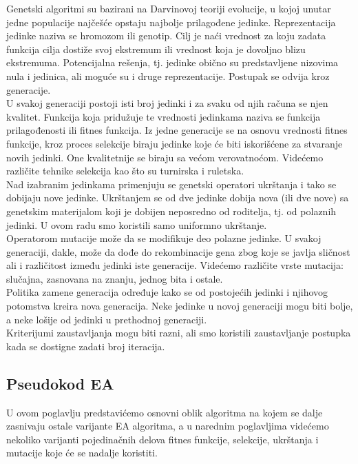 \documentclass{article}
\begin{document}
Genetski algoritmi \cite{vi_Janicic} su bazirani na Darvinovoj teoriji evolucije, u kojoj unutar jedne populacije najčešće opstaju najbolje prilagođene jedinke. Reprezentacija jedinke naziva se hromozom ili genotip. Cilj je naći vrednost za koju zadata funkcija cilja dostiže svoj ekstremum ili vrednost koja je dovoljno blizu ekstremuma. Potencijalna rešenja, tj. jedinke obično su predstavljene nizovima nula i jedinica, ali moguće su i druge reprezentacije. Postupak se odvija kroz generacije.\\

U svakoj generaciji postoji isti broj jedinki i za svaku od njih računa se njen kvalitet. Funkcija koja pridužuje te vrednosti jedinkama naziva se funkcija prilagođenosti ili fitnes funkcija. Iz jedne generacije se na osnovu vrednosti fitnes funkcije, kroz proces selekcije biraju jedinke koje će biti iskorišćene za stvaranje novih jedinki. One kvalitetnije se biraju sa većom verovatnoćom. Videćemo različite tehnike selekcija kao što su turnirska i ruletska. \\

Nad izabranim jedinkama primenjuju se genetski operatori ukrštanja i tako se dobijaju nove jedinke. Ukrštanjem se od dve jedinke dobija nova (ili dve nove) sa genetskim materijalom koji je dobijen neposredno od roditelja, tj. od polaznih jedinki. U ovom radu smo koristili samo uniformno ukrštanje. \\

Operatorom mutacije može da se modifikuje deo polazne jedinke. U svakoj generaciji, dakle, može da dođe do rekombinacije gena zbog koje se javlja sličnost ali i različitost između jedinki iste generacije. Videćemo različite vrste mutacija: slučajna, zasnovana na znanju, jednog bita i ostale. \\

Politika zamene generacija određuje kako se od postojećih jedinki i njihovog potomstva kreira nova generacija. Neke jedinke u novoj generaciji mogu biti bolje, a neke lošije od jedinki u prethodnoj generaciji. \\

Kriterijumi zaustavljanja mogu biti razni, ali smo koristili zaustavljanje postupka kada se dostigne zadati broj iteracija.

\subsection{Pseudokod EA}
\label{sec:ea_preudokod}
U ovom poglavlju predstavićemo osnovni oblik algoritma na kojem se dalje zasnivaju ostale
varijante EA algoritma, a u narednim poglavljima videćemo nekoliko varijanti pojedinačnih
delova fitnes funkcije, selekcije, ukrštanja i mutacije koje će se nadalje koristiti. \\
\end{document}
